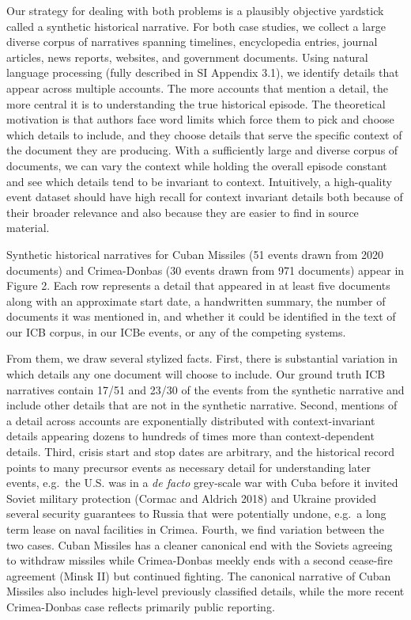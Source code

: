 \documentclass{article}
\begin{document}
Our strategy for dealing with both problems is a plausibly objective
yardstick called a synthetic historical narrative. For both case
studies, we collect a large diverse corpus of narratives spanning
timelines, encyclopedia entries, journal articles, news reports,
websites, and government documents. Using natural language processing
(fully described in SI Appendix 3.1), we identify details that appear
across multiple accounts. The more accounts that mention a detail, the
more central it is to understanding the true historical episode. The
theoretical motivation is that authors face word limits which force them
to pick and choose which details to include, and they choose details
that serve the specific context of the document they are producing. With
a sufficiently large and diverse corpus of documents, we can vary the
context while holding the overall episode constant and see which details
tend to be invariant to context. Intuitively, a high-quality event
dataset should have high recall for context invariant details both
because of their broader relevance and also because they are easier to
find in source material.

Synthetic historical narratives for Cuban Missiles (51 events drawn from
2020 documents) and Crimea-Donbas (30 events drawn from 971 documents)
appear in Figure 2. Each row represents a detail that appeared in at
least five documents along with an approximate start date, a handwritten
summary, the number of documents it was mentioned in, and whether it
could be identified in the text of our ICB corpus, in our ICBe events,
or any of the competing systems.

From them, we draw several stylized facts. First, there is substantial
variation in which details any one document will choose to include. Our
ground truth ICB narratives contain 17/51 and 23/30 of the events from
the synthetic narrative and include other details that are not in the
synthetic narrative. Second, mentions of a detail across accounts are
exponentially distributed with context-invariant details appearing
dozens to hundreds of times more than context-dependent details. Third,
crisis start and stop dates are arbitrary, and the historical record
points to many precursor events as necessary detail for understanding
later events, e.g.~the U.S. was in a \textit{de facto} grey-scale war
with Cuba before it invited Soviet military protection (Cormac and
Aldrich 2018) and Ukraine provided several security guarantees to Russia
that were potentially undone, e.g.~a long term lease on naval facilities
in Crimea. Fourth, we find variation between the two cases. Cuban
Missiles has a cleaner canonical end with the Soviets agreeing to
withdraw missiles while Crimea-Donbas meekly ends with a second
cease-fire agreement (Minsk II) but continued fighting. The canonical
narrative of Cuban Missiles also includes high-level previously
classified details, while the more recent Crimea-Donbas case reflects
primarily public reporting.
\end{document}
